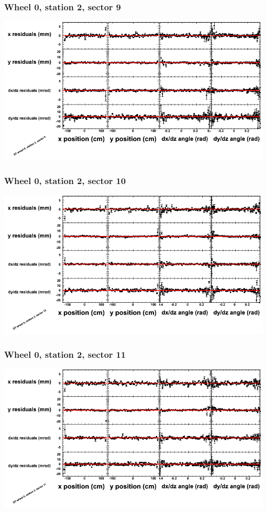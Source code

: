 \documentclass[compress]{beamer}
\begin{document}
\begin{frame}
\frametitle{Wheel 0, station 2, sector 9}
\includegraphics[width=\linewidth]{tmppoly_MBwhCst2sec09.png}
\end{frame}

\begin{frame}
\frametitle{Wheel 0, station 2, sector 10}
\includegraphics[width=\linewidth]{tmppoly_MBwhCst2sec10.png}
\end{frame}

\begin{frame}
\frametitle{Wheel 0, station 2, sector 11}
\includegraphics[width=\linewidth]{tmppoly_MBwhCst2sec11.png}
\end{frame}
\end{document}
